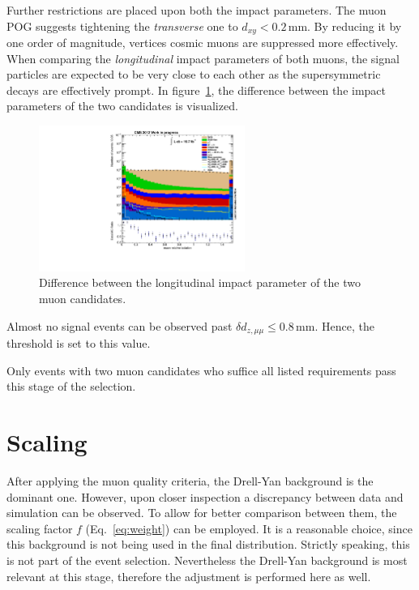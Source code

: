 Further restrictions are placed upon both the impact parameters. The muon POG suggests tightening the \textit{transverse} one to $d_{xy} < 0.2\,\text{mm}$. By reducing it by one order of magnitude, vertices  cosmic muons are suppressed more effectively. When comparing the \textit{longitudinal} impact parameters of both muons, the signal particles are expected to be very close to each other as the supersymmetric decays are effectively prompt. In figure~\ref{fig:deltadz}, the difference between the impact parameters of the two candidates is visualized.

\begin{figure}[ht!]
  \centering
    \includegraphics[width=0.6\textwidth]{plots/reliso.pdf}
  \caption{Difference between the longitudinal impact parameter of the two muon candidates.}
  \label{fig:deltadz}
\end{figure}

\noindent Almost no signal events can be observed past $\delta d_{z, \mu\mu} \leq 0.8\,\text{mm}$. Hence, the threshold is set to this value.

Only events with two muon candidates who suffice all listed requirements pass this stage of the selection.



\section{Scaling}
\label{sec:scaling}

After applying the muon quality criteria, the Drell-Yan background is the dominant one. However, upon closer inspection a discrepancy between data and simulation can be observed. To allow for better comparison between them, the scaling factor $f$ (Eq.~\eqref{eq:weight}) can be employed. It is a reasonable choice, since this background is not being used in the final distribution. Strictly speaking, this is not part of the event selection. Nevertheless the Drell-Yan background is most relevant at this stage, therefore the adjustment is performed here as well.

